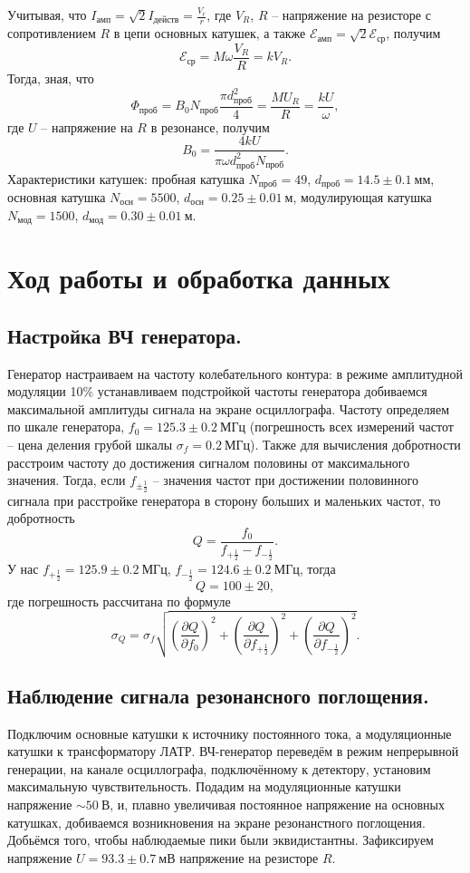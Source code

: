 \documentclass[a4paper,12pt]{article}
\begin{document}
Учитывая, что $I_{\text{амп}} = \sqrt{2} I_{\text{действ}}=\frac{V_r}{r}$, где $V_R$, $R$ -- напряжение на резисторе с сопротивлением $R$ в цепи основных катушек, а также $\mathcal{E}_{\text{амп}} = \sqrt{2}\mathcal{E}_{\text{ср}}$, получим
\[\mathcal{E}_{\text{ср}} = M \omega \dfrac{V_R}{R} = k V_R.\]
Тогда, зная, что
\[\Phi_{\text{проб}} = B_0 N_{\text{проб}} \dfrac{\pi d_{\text{проб}}^2}{4} =  \dfrac{MU_R}{R} = \dfrac{k U}{\omega},\]
где $U$ -- напряжение на $R$ в резонансе, получим
\begin{equation}\label{1}
B_0 = \dfrac{4k U}{\pi \omega d^2_{\text{проб}} N_{\text{проб}}}.
\end{equation}
Характеристики катушек: пробная катушка $N_{\text{проб}} = 49$, $d_{\text{проб}} = 14.5\pm 0.1~\text{мм}$, основная катушка $N_{\text{осн}} = 5500$, $d_{\text{осн}} = 0.25\pm 0.01~\text{м}$,  модулирующая катушка $N_{\text{мод}} = 1500$, $d_{\text{мод}} = 0.30\pm 0.01~\text{м}$.
\section*{Ход работы и обработка данных}
\subsection*{Настройка ВЧ генератора.}
Генератор настраиваем на частоту колебательного контура: в режиме амплитудной модуляции 10\% устанавливаем подстройкой частоты генератора добиваемся максимальной амплитуды сигнала на экране осциллографа. Частоту определяем по шкале генератора, $f_0 = 125.3 \pm 0.2~\text{МГц}$ (погрешность всех измерений частот -- цена деления грубой шкалы $\sigma_f = 0.2~\text{МГц}$). Также для вычисления добротности расстроим частоту до достижения сигналом половины от максимального значения. Тогда, если $f_{\pm\frac{1}{2}}$ -- значения частот при достижении половинного сигнала при расстройке генератора в сторону больших и маленьких частот, то добротность
\[Q = \dfrac{f_0}{f_{+\frac{1}{2}} - f_{-\frac{1}{2}}}.\]
У нас $f_{+\frac{1}{2}} = 125.9 \pm 0.2~\text{МГц}$, $f_{-\frac{1}{2}} = 124.6 \pm 0.2~\text{МГц}$, тогда
\[Q = 100 \pm 20,\]
где погрешность рассчитана по формуле
\[\sigma_Q = \sigma_f \sqrt{\left( \dfrac{\partial Q}{\partial f_0}\right)^2 + \left( \dfrac{\partial Q}{\partial f_{+\frac{1}{2}}}\right)^2 + \left( \dfrac{\partial Q}{\partial f_{-\frac{1}{2}}}\right)^2}.\]
\subsection*{Наблюдение сигнала резонансного поглощения.}
Подключим основные катушки к источнику постоянного тока, а модуляционные катушки к трансформатору ЛАТР. ВЧ-генератор переведём в режим непрерывной генерации, на канале осциллографа, подключённому к детектору, установим максимальную чувствительность. Подадим на модуляционные катушки напряжение $\sim 50~\text{В}$, и, плавно увеличивая постоянное напряжение на основных катушках, добиваемся возникновения на экране резонанстного поглощения. Добьёмся того, чтобы наблюдаемые пики были эквидистантны. Зафиксируем напряжение $U = 93.3 \pm 0.7~\text{мВ}$ напряжение на резисторе $R$.
\end{document}
